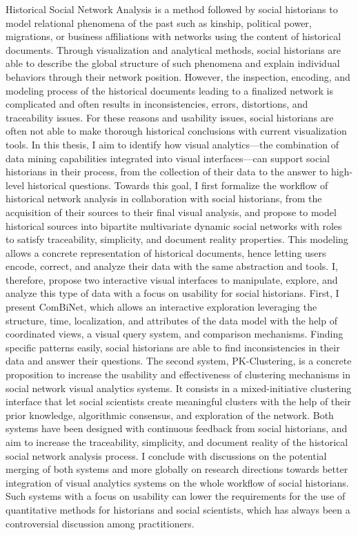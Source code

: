 \newcommand{\abstracteng}{
Historical Social Network Analysis is a method followed by social historians to model relational phenomena of the past such as kinship, political power, migrations, or business affiliations with networks using the content of historical documents.
Through visualization and analytical methods, social historians are able to describe the global structure of such phenomena and explain individual behaviors through their network position.
However, the inspection, encoding, and modeling process of the historical documents leading to a finalized network is complicated and often results in inconsistencies, errors, distortions, and traceability issues.
For these reasons and usability issues, social historians are often not able to make thorough historical conclusions with current visualization tools. 
In this thesis, I aim to identify how visual analytics---the combination of data mining capabilities integrated into visual interfaces---can support social historians in their process, from the collection of their data to the answer to high-level historical questions.
Towards this goal, I first formalize the workflow of historical network analysis in collaboration with social historians, from the acquisition of their sources to their final visual analysis, and propose to model historical sources into bipartite multivariate dynamic social networks with roles to satisfy traceability, simplicity, and document reality properties.
This modeling allows a concrete representation of historical documents, hence letting users encode, correct, and analyze their data with the same abstraction and tools.
I, therefore, propose two interactive visual interfaces to manipulate, explore, and analyze this type of data with a focus on usability for social historians.
First, I present ComBiNet, which allows an interactive exploration leveraging the structure, time, localization, and attributes of the data model with the help of coordinated views, a visual query system, and comparison mechanisms. 
Finding specific patterns easily, social historians are able to find inconsistencies in their data and answer their questions.
The second system, PK-Clustering, is a concrete proposition to increase the usability and effectiveness of clustering mechanisms in social network visual analytics systems. It consists in a mixed-initiative clustering interface that let social scientists create meaningful clusters with the help of their prior knowledge, algorithmic consensus, and exploration of the network.
Both systems have been designed with continuous feedback from social historians, and aim to increase the traceability, simplicity, and document reality of the historical social network analysis process.
I conclude with discussions on the potential merging of both systems and more globally on research directions towards better integration of visual analytics systems on the whole workflow of social historians.
Such systems with a focus on usability can lower the requirements for the use of quantitative methods for historians and social scientists, which has always been a controversial discussion among practitioners.
}

\abstracteng